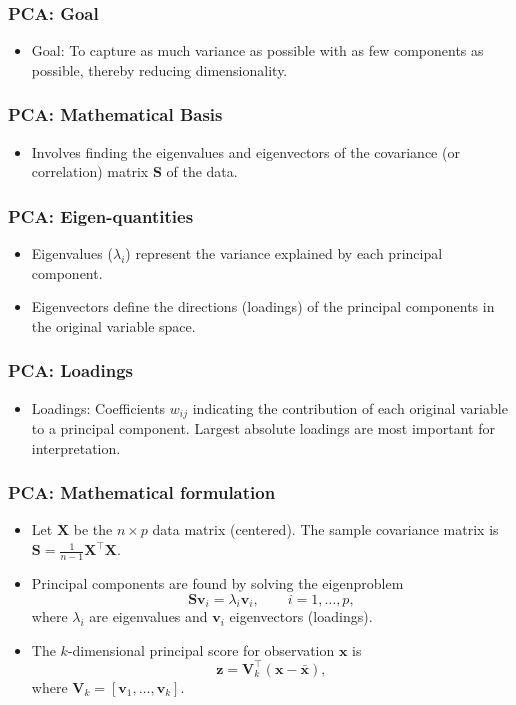 \documentclass{beamer}
\begin{document}
\begin{frame}
    \frametitle{PCA: Goal}
    \begin{itemize}
        \item Goal: To capture as much variance as possible with as few components as possible, thereby reducing dimensionality.
    \end{itemize}
\end{frame}

\begin{frame}
    \frametitle{PCA: Mathematical Basis}
    \begin{itemize}
        \item Involves finding the \alert{eigenvalues} and \alert{eigenvectors} of the covariance (or correlation) matrix $\mathbf{S}$ of the data.
    \end{itemize}
\end{frame}

\begin{frame}
    \frametitle{PCA: Eigen-quantities}
    \begin{itemize}
        \item Eigenvalues ($\lambda_i$) represent the variance explained by each principal component.
        \item Eigenvectors define the directions (loadings) of the principal components in the original variable space.
    \end{itemize}
\end{frame}

\begin{frame}
    \frametitle{PCA: Loadings}
    \begin{itemize}
        \item Loadings: Coefficients $w_{ij}$ indicating the contribution of each original variable to a principal component. Largest absolute loadings are most important for interpretation.
    \end{itemize}
\end{frame}

\begin{frame}
    \frametitle{PCA: Mathematical formulation}
    \begin{itemize}
        \item Let $\mathbf{X}$ be the $n\times p$ data matrix (centered). The sample covariance matrix is $\mathbf{S}=\frac{1}{n-1}\mathbf{X}^\top\mathbf{X}$.
        \item Principal components are found by solving the eigenproblem
        \[\mathbf{S}\mathbf{v}_i=\lambda_i\mathbf{v}_i,\qquad i=1,\dots,p,
        \]
        where $\lambda_i$ are eigenvalues and $\mathbf{v}_i$ eigenvectors (loadings).
        \item The $k$-dimensional principal score for observation $\mathbf{x}$ is
        \[\mathbf{z}=\mathbf{V}_k^\top(\mathbf{x}-\bar{\mathbf{x}}),\]
        where $\mathbf{V}_k=[\mathbf{v}_1,\dots,\mathbf{v}_k]$.
    \end{itemize}
\end{frame}
\end{document}
